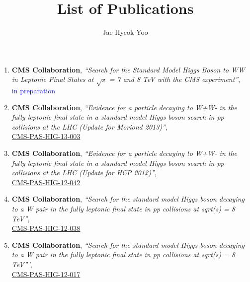 \documentclass[12pt,letter]{article}
\begin{document}
 

\title{List of Publications}
\author{Jae Hyeok Yoo}
\date{}


\maketitle


\begin{enumerate}

\item 
\textbf{CMS Collaboration}, \textit{``Search for the Standard Model Higgs
Boson to WW in Leptonic Final States at $\sqrt{s}$ = 7 and 8 TeV with the CMS experiment''}, \\
\textcolor{blue}{in preparation}  

\item 
\textbf{CMS Collaboration}, \textit{``Evidence for a particle decaying to W+W- in the fully leptonic final state in a standard model Higgs boson search in pp collisions at the LHC (Update for Moriond 2013)''}, \\
\href{http://cds.cern.ch/record/1523673/files/HIG-13-003-pas.pdf}{CMS-PAS-HIG-13-003} 

\item 
\textbf{CMS Collaboration}, \textit{``Evidence for a particle decaying to W+W- in the fully leptonic final state in a standard model Higgs boson search in pp collisions at the LHC (Update for HCP 2012)''}, \\ 
\href{http://cds.cern.ch/record/1493602/files/HIG-12-042-pas.pdf}{CMS-PAS-HIG-12-042}  

\item 
\textbf{CMS Collaboration}, \textit{``Search for the standard model Higgs boson decaying to a W pair in the fully leptonic final state in pp collisions at sqrt(s) = 8 TeV''}, \\
\href{http://cds.cern.ch/record/1478185/files/HIG-12-038-pas.pdf}{CMS-PAS-HIG-12-038} 

\item 
\textbf{CMS Collaboration}, \textit{``Search for the standard model Higgs boson decaying to a W pair in the fully leptonic final state in pp collisions at sqrt(s) = 8 TeV'''}, \\ 
\href{http://cds.cern.ch/record/1460424/files/HIG-12-017-pas.pdf}{CMS-PAS-HIG-12-017}  
\end{enumerate}
\end{document}

